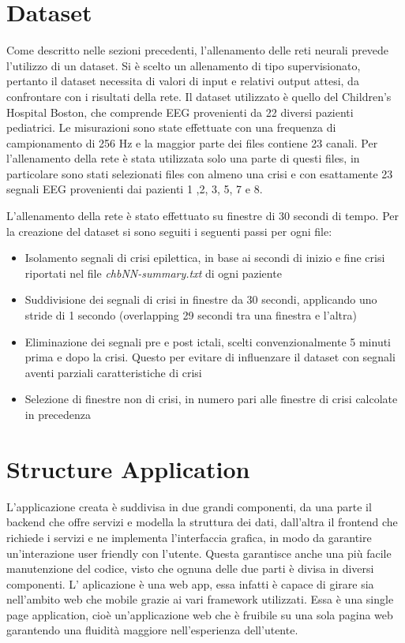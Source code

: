 \documentclass{article}
\begin{document}
\section{Dataset}
Come descritto nelle sezioni precedenti, l'allenamento delle reti neurali prevede l'utilizzo di un dataset. Si è scelto un allenamento di tipo supervisionato, pertanto il dataset necessita di valori di input e relativi output attesi, da confrontare con i risultati della rete. Il dataset utilizzato è quello del Children's Hospital Boston, che comprende EEG provenienti da 22 diversi pazienti pediatrici. Le misurazioni sono state effettuate con una frequenza di campionamento di 256 Hz e la maggior parte dei files contiene 23 canali. Per l'allenamento della rete è stata utilizzata solo una parte di questi files, in particolare sono stati selezionati files con almeno una crisi e con esattamente 23 segnali EEG provenienti dai pazienti 1 ,2, 3, 5, 7 e 8.

L'allenamento della rete è stato effettuato su finestre di 30 secondi di tempo. Per la creazione del dataset si sono seguiti i seguenti passi per ogni file:
\begin{itemize}
\item Isolamento segnali di crisi epilettica, in base ai secondi di inizio e fine crisi riportati nel file \textit{chbNN-summary.txt} di ogni paziente
\item Suddivisione dei segnali di crisi in finestre da 30 secondi, applicando uno stride di 1 secondo (overlapping 29 secondi tra una finestra e l'altra)
\item Eliminazione dei segnali pre e post ictali, scelti convenzionalmente 5 minuti prima e dopo la crisi. Questo per evitare di influenzare il dataset con segnali aventi parziali caratteristiche di crisi
\item Selezione di finestre non di crisi, in numero pari alle finestre di crisi calcolate in precedenza
\end{itemize}
\section{Structure Application}
L'applicazione creata è suddivisa in due grandi componenti, da una parte il backend che offre servizi e modella la struttura dei dati, dall'altra il frontend che richiede i servizi e ne implementa l'interfaccia grafica, in modo da garantire un'interazione user friendly con l'utente.
Questa garantisce anche una più facile manutenzione del codice, visto che ognuna delle due parti è divisa in diversi componenti.
L' aplicazione è una web app, essa infatti è capace di girare sia nell'ambito web che mobile grazie ai vari framework utilizzati.
Essa è una single page application, cioè un'applicazione web che è fruibile su una sola pagina web garantendo una fluidità maggiore nell'esperienza dell'utente.
\end{document}
